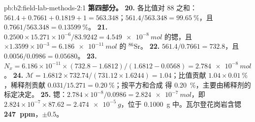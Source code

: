 \begin{solution}{pb:b2:field-lab-methods-2:1}
\noindent\textbf{第四部分。}
\textbf{20.} 各比值对 88 之和：$561.4 + 0.7661 + 0.1819 + 1 = 563.348$；$561.4/563.348 =
\qty{99.65}{\percent}$，且 $0.7661/563.348 = \qty{0.13599}{\percent}$。
\textbf{21.} $0.2500 \times 15.271 \times 10^{-6}/83.9242 = \qty{4.549e-8}{mol}$ 的锶，且
$\times 1.3599 \times 10^{-3} = \qty{6.186e-11}{mol}$ 的 $^{86}\mathrm{Sr}$。
\textbf{22.} $561.4/0.7661 = 732.8$，且 $0.0056/0.0986 = 0.05680$。
\textbf{23.} $N_x = 6.186 \times 10^{-11} \times (732.8 - 1.6812)/(1.6812 - 0.0568) =
\qty{2.784e-8}{mol}$。
\textbf{24.} $\mathcal M = 1.6812 \times 732.74/(731.12 \times 1.6244) = 1.04$；比值贡献
$1.04 \times \qty{0.01}{\percent}$，稀释剂贡献 $0.031/15.271 = \qty{0.20}{\percent}$；按平方和合成
得 \qty{0.20}{\percent}，主要由稀释剂的标定决定。
\textbf{25.} 锶：$2.784 \times 10^{-8}/0.0986 = \qty{2.824e-7}{mol}$，即 $2.824 \times
10^{-7} \times 87.62 = \qty{2.474e-5}{g}$，位于 \qty{0.1000}{g} 中。瓦尔登花岗岩含锶
\textbf{\qty[text-series-to-math=true]{247}{ppm}}，$\pm 0.5$。
\end{solution}
